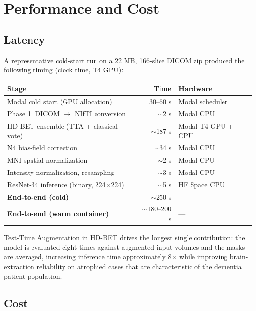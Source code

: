 \documentclass[11pt, a4paper]{article}
\begin{document}
\section{Performance and Cost}

\subsection{Latency}

A representative cold-start run on a 22 MB, 166-slice DICOM zip produced the following timing (clock time, T4 GPU):

\begin{center}
\small
\begin{tabular}{>{\raggedright\arraybackslash}p{6.4cm} r >{\raggedright\arraybackslash}p{4.0cm}}
\toprule
\textbf{Stage} & \textbf{Time} & \textbf{Hardware} \\
\midrule
Modal cold start (GPU allocation) & 30--60 s & Modal scheduler \\
Phase 1: DICOM $\rightarrow$ NIfTI conversion & $\sim$2 s & Modal CPU \\
HD-BET ensemble (TTA + classical vote) & $\sim$187 s & Modal T4 GPU + CPU \\
N4 bias-field correction & $\sim$34 s & Modal CPU \\
MNI spatial normalization & $\sim$2 s & Modal CPU \\
Intensity normalization, resampling & $\sim$3 s & Modal CPU \\
ResNet-34 inference (binary, 224$\times$224) & $\sim$5 s & HF Space CPU \\
\midrule
\textbf{End-to-end (cold)} & $\sim$250 s & --- \\
\textbf{End-to-end (warm container)} & $\sim$180--200 s & --- \\
\bottomrule
\end{tabular}
\end{center}

Test-Time Augmentation in HD-BET drives the longest single contribution: the model is evaluated eight times against augmented input volumes and the masks are averaged, increasing inference time approximately 8$\times$ while improving brain-extraction reliability on atrophied cases that are characteristic of the dementia patient population.

\subsection{Cost}
\end{document}
